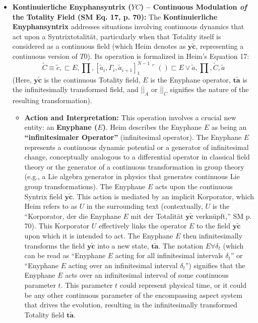 \documentclass[12pt]{article}
\newcommand{\q}[1]{\enquote{#1}}
\newcommand{\syntrixtotalitaet}{T0}
\newcommand{\kontinuierlicheEnyphansyntrix}{YC}
\newcommand{\enyphane}{E}
\begin{document}
\begin{itemize}
    \item \textbf{Kontinuierliche Enyphansyntrix (\( \kontinuierlicheEnyphansyntrix \)) – Continuous Modulation \textit{of} the Totality Field (SM Eq. 17, p. 70):}
    The \textbf{Kontinuierliche Enyphansyntrix} addresses situations involving continuous dynamics that act upon a Syntrixtotalität, particularly when that Totality itself is considered as a continuous field (which Heim denotes as \( \mathbf{y\widetilde{c}} \), representing a continuous version of \( \syntrixtotalitaet \)). Its operation is formalized in Heim's Equation 17:
    \begin{equation}
    \widetilde{C} \equiv \widetilde{c}, \sqsubset E, \prod, [\widetilde{a}_i, \Gamma_i, \widetilde{a}_{i+1}]_{1}^{N-1} \ulcorner( ) \sqsubset E \vee \widetilde{a}, \prod, \widetilde{C}, \widetilde{a}
    \label{eq:original_kontinuierliche_enyphansyntrix}
    \end{equation}
    (Here, \( \mathbf{y\widetilde{c}} \) is the continuous Totality field, \( \enyphane \) is the Enyphane operator, \( \mathbf{t\widetilde{a}} \) is the infinitesimally transformed field, and \( \overline{||}_A \) or \( \overline{||}_C \) signifies the nature of the resulting transformation).
    \begin{itemize}
        \item \textbf{Action and Interpretation:} This operation involves a crucial new entity: an \textbf{Enyphane (\( \enyphane \))}. Heim describes the Enyphane \( \enyphane \) as being an \textbf{\q{infinitesimaler Operator}} (infinitesimal operator). The Enyphane \( \enyphane \) represents a continuous dynamic potential or a generator of infinitesimal change, conceptually analogous to a differential operator in classical field theory or the generator of a continuous transformation in group theory (e.g., a Lie algebra generator in physics that generates continuous Lie group transformations). The Enyphane \( \enyphane \) acts upon the continuous Syntrix field \( \mathbf{y\widetilde{c}} \). This action is mediated by an implicit Korporator, which Heim refers to as \( U \) in the surrounding text (contextually, \( U \) is the \q{Korporator, der die Enyphane \( \enyphane \) mit der Totalität \( \mathbf{y\widetilde{c}} \) verknüpft,} SM p. 70). This Korporator \(U\) effectively links the operator \( \enyphane \) to the field \( \mathbf{y\widetilde{c}} \) upon which it is intended to act. The Enyphane \( \enyphane \) then infinitesimally transforms the field \( \mathbf{y\widetilde{c}} \) into a new state, \( \mathbf{t\widetilde{a}} \). The notation \( \enyphane\forall\delta_t \) (which can be read as \q{Enyphane \( \enyphane \) acting for all infinitesimal intervals \( \delta_t \)} or \q{Enyphane \( \enyphane \) acting over an infinitesimal interval \( \delta_t \)}) signifies that the Enyphane \( \enyphane \) acts over an infinitesimal interval of some continuous parameter \( t \). This parameter \( t \) could represent physical time, or it could be any other continuous parameter of the encompassing aspect system that drives the evolution, resulting in the infinitesimally transformed Totality field \( \mathbf{t\widetilde{a}} \).

\end{itemize}
\end{itemize}
\end{document}
